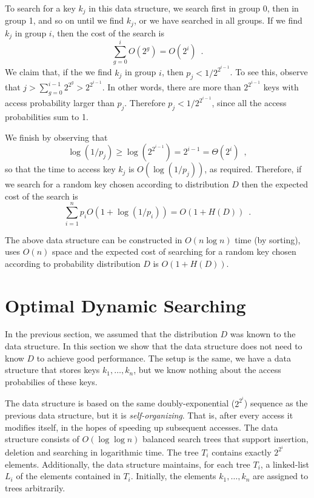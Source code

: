 To search for a key $k_j$ in this data structure, we search first in
group 0, then in group 1, and so on until we find $k_j$, or we have
searched in all groups.  If we find $k_j$ in group $i$, then the cost
of the search is
\[
\sum_{g=0}^i O(2^g) = O(2^i) \enspace .
\]
We claim that, if the we find $k_j$ in group $i$, then $p_j <
1/2^{2^{i-1}}$.  To see this, observe that $j>\sum_{g=0}^{i-1}
2^{2^{g}}>2^{2^{i-1}}$.  In other words, there are more than
$2^{2^{i-1}}$ keys with access probability larger than $p_j$.
Therefore $p_j<1/2^{2^{i-1}}$, since all the access probabilities sum
to 1.

We finish by observing that 
\[
  \log(1/p_j) \ge \log\left(2^{2^{i-1}}\right) = 2^{i-1} = \Theta(2^i) \enspace ,
\]
so that the time to access key $k_j$ is $O(\log(1/p_j))$, as required.
Therefore, if we search for a random key chosen according to
distribution $D$ then the expected cost of the search is
\[
\sum_{i=1}^n p_iO(1+\log(1/p_i)) = O(1+H(D)) \enspace .
\]

\begin{thm}
The above data structure can be constructed in $O(n\log n)$ time (by
sorting), uses $O(n)$ space and the expected cost of searching for a
random key chosen according to probability distribution $D$ is
$O(1+H(D))$.
\end{thm}

\section{Optimal Dynamic Searching}

In the previous section, we assumed that the distribution $D$ was
known to the data structure.  In this section we show that the data
structure does not need to know $D$ to achieve good performance.
The setup is the same, we have a data structure that stores keys
$k_1,\ldots,k_n$, but we know nothing about the access probabilies
of these keys.

The data structure is based on the same doubly-exponential ($2^{2^i}$)
sequence as the previous data structure, but it is
\emph{self-organizing}.  That is, after every access it modifies
itself, in the hopes of speeding up subsequent accesses.  The data
structure consists of $O(\log\log n)$ balanced search trees that
support insertion, deletion and searching in logarithmic time.  The
tree $T_i$ contains exactly $2^{2^i}$ elements.  Additionally, the
data structure maintains, for each tree $T_i$, a linked-list $L_i$ of
the elements contained in $T_i$.  Initially, the elements
$k_1,\ldots,k_n$ are assigned to trees arbitrarily.


